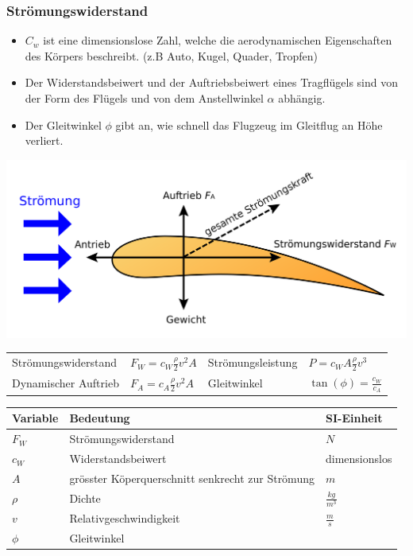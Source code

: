 \documentclass[
a4paper,
oneside,
landscape, 
8pt,
]{scrartcl}
\begin{document}
\begin{multicols*}{2}
\subsubsection{Strömungswiderstand}
\begin{itemize}
	\item $C_w$ ist eine dimensionslose Zahl, welche die aerodynamischen Eigenschaften des Körpers beschreibt. (z.B Auto, Kugel, Quader, Tropfen)
	\item Der Widerstandsbeiwert und der Auftriebsbeiwert eines Tragflügels sind von der Form des Flügels und von dem Anstellwinkel $\alpha$ abhängig. 
	\item Der Gleitwinkel $\phi$ gibt an, wie schnell das Flugzeug im Gleitflug an Höhe verliert.
\end{itemize}

\includegraphics[width=0.6\linewidth]{images/dynamischer_auftrieb}

\begin{tabbing}
	\begin{tabu} to \linewidth {l X l X}
		\toprule
		Strömungswiderstand & $F_W = c_W  \frac{\rho}{2} v^2 A$ &
		Strömungsleistung & $P = c_W A \frac{\rho}{2}v^3$ \\
		Dynamischer Auftrieb & $F_{A} = c_{A} \frac{\rho}{2} v^2 A$ & 
		Gleitwinkel & $\tan(\phi) = \frac{c_W}{c_A}$ \\
	\end{tabu}
\end{tabbing}

\begin{tabbing}
	\begin{tabu} to \linewidth {l X l}
		Variable & Bedeutung & SI-Einheit \\
		\midrule
		$F_W$ & Strömungswiderstand & $N$\\
		$c_W$ & Widerstandsbeiwert & dimensionslos \\
		$A$ & grösster Köperquerschnitt senkrecht zur Strömung & $m$\\
		$\rho$ & Dichte & $\frac{kg}{m^3}$ \\
		$v$ & Relativgeschwindigkeit & $\frac{m}{s}$ \\	
		$\phi$ & Gleitwinkel & \\	
		\bottomrule
	\end{tabu}
\end{tabbing}


\end{multicols*}
\end{document}
